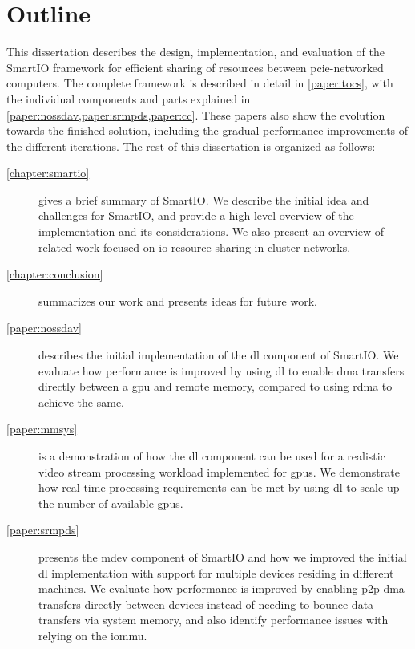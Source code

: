 \section{Outline}
This dissertation describes the design, implementation, and evaluation of the SmartIO framework for efficient sharing of resources between \gls{pcie}-networked computers.
%
The complete framework is described in detail in \cref{paper:tocs}, with the individual components and parts explained in \cref{paper:nossdav,paper:srmpds,paper:cc}.
%
These papers also show the evolution towards the finished solution, including the gradual performance improvements of the different iterations.
%
The rest of this dissertation is organized as follows:
%
\begin{description}
    \item[\cref{chapter:smartio}]
        gives a brief summary of SmartIO.
        We describe the initial idea and challenges for SmartIO, and provide a high-level overview of the implementation and its considerations.
        We also present an overview of related work focused on \gls{io} resource sharing in cluster networks.

    \item[\cref{chapter:conclusion}]
        summarizes our work and presents ideas for future work.

    \item[\cref{paper:nossdav}]
        describes the initial implementation of the \gls{dl} component of SmartIO.
        We evaluate how performance is improved by using \gls{dl} to enable \gls{dma} transfers directly between a \gls{gpu} and remote memory, compared to using \gls{rdma} to achieve the same.

    \item[\cref{paper:mmsys}]
        is a demonstration of how the \gls{dl} component can be used for a realistic video stream processing workload implemented for \glspl{gpu}.
        We demonstrate how real-time processing requirements can be met by using \gls{dl} to scale up the number of available \glspl{gpu}.

    \item[\cref{paper:srmpds}]
        presents the \gls{mdev} component of SmartIO and how we improved the initial \gls{dl} implementation with support for multiple devices residing in different machines. 
        We evaluate how performance is improved by enabling \gls{p2p} \gls{dma} transfers directly between devices instead of needing to bounce data transfers via system memory, and also identify performance issues with relying on the \gls{iommu}.


\end{description}
